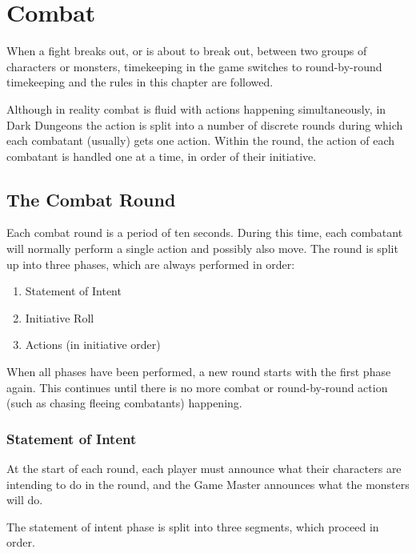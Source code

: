 \chapter[green]{Combat}
\label{chap:Combat}
\thispagestyle{plain}

\begin{multicols*}{2}
When a fight breaks out, or is about to break out, between two groups of characters or monsters, timekeeping in the game switches to round-by-round timekeeping and the rules in this chapter are followed.

Although in reality combat is fluid with actions happening simultaneously, in Dark Dungeons the action is split into a number of discrete rounds during which each combatant (usually) gets one action. Within the round, the action of each combatant is handled one at a time, in order of their initiative.

\section{The Combat Round}
Each combat round is a period of ten seconds. During this time, each combatant will normally perform a single action and possibly also move. The round is split up into three phases, which are always performed in order:

\begin{enumerate}
	\item{Statement of Intent}
	\item{Initiative Roll}
	\item{Actions (in initiative order)}
\end{enumerate}

When all phases have been performed, a new round starts with the first phase again. This continues until there is no more combat or round-by-round action (such as chasing fleeing combatants) happening.

\subsection{Statement of Intent}
At the start of each round, each player must announce what their characters are intending to do in the round, and the Game Master announces what the monsters will do.

The statement of intent phase is split into three segments, which proceed in order.


\end{multicols*}
